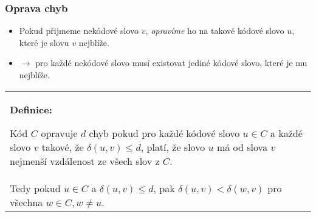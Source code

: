 \documentclass{beamer}
\newenvironment{definice}
{
    \begin{center}
    \begin{tabular}{p{9cm}}
    \textbf{Definice:}
}
{
    \end{tabular}
    \end{center}
}
\newenvironment{itemizex}%
  {\large \begin{itemize}%
    \setlength{\itemsep}{8pt}%
    \setlength{\parskip}{8pt}}%
  {\end{itemize}}
\begin{document}
\begin{frame}[t,fragile]\frametitle{Oprava chyb} 
    \begin{itemizex}
        \item Pokud přijmeme nekódové slovo $v$, \textit{opravíme} ho na takové kódové slovo $u$, které je slovu $v$ nejblíže. 
        \item $\longrightarrow$ pro každé nekódové slovo musí existovat jediné kódové slovo, které je mu nejblíže. 
    \end{itemizex}

\begin{definice}
Kód $C$ opravuje $d$ chyb pokud pro každé kódové slovo $u\in C$ a každé slovo $v$ takové, že $\delta(u, v) \le d$, platí, že slovo $u$ má od slova $v$ nejmenší vzdálenost ze všech slov z $C$. \\Tedy pokud $u\in C$ a $\delta(u,v)\le d$, pak $\delta(u,v)<\delta(w,v)$ pro všechna $w\in C, w\ne u$.
\end{definice}
\end{frame}
\end{document}

